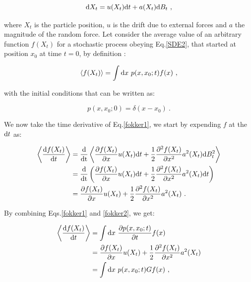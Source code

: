 \begin{equation}
	\textnormal{d}X_t = u(X_t) \textnormal{d}t + a(X_t)\textnormal{d}B_t ~,
	\label{SDE2}
\end{equation}

where $X_t$ is the particle position,  $u$ is the drift due to external forces and $a$ the magnitude of the random force. Let consider the average value of an arbitrary function $f(X_t)$ for a stochastic process obeying Eq.\ref{SDE2}, that started at position $x_0$ at time $t=0$, by definition \cite{le_bellac_equilibrium_2004}:

\begin{equation}
	\langle f(X_t) \rangle = \int \textnormal{d}x ~ p(x, x_0 ; t) f(x) ~,
	\label{fokker1}
\end{equation}

with the initial conditions that can be written as:

\begin{equation}
	p(x, x_0; 0) = \delta (x - x_0) ~.
\end{equation}

We now take the time derivative of Eq.\ref{fokker1}, we start by expending $ f$ at the $\textnormal{d}t$ as:

\begin{equation}
	\begin{aligned}
	\left\langle \frac{\textnormal{d}f(X_t)}{\textnormal{d}t} \right\rangle  &= \frac{\textnormal{d}}{\textnormal{dt}}\left\langle   \frac{\partial f(X_t)}{\partial x} u(X_t) \textnormal{d}t + \frac{1}{2} \frac{\partial^2 f(X_t)}{\partial x^2} a^2 (X_t) \textnormal{d}B_t^2   \right\rangle \\
	& =  \frac{\textnormal{d}}{\textnormal{dt}} \left( \frac{\partial f(X_t)}{\partial x} u(X_t) \textnormal{d}t + \frac{1}{2} \frac{\partial^2 f(X_t)}{\partial x^2} a^2 (X_t) \textnormal{d}t \right) \\
	& = \frac{\partial f(X_t)}{\partial x} u(X_t) + \frac{1}{2} \frac{\partial^2 f(X_t)}{\partial x^2} a^2 (X_t) ~.
	\end{aligned}
	\label{fokker2}
\end{equation}

By combining Eqs.\ref{fokker1} and \ref{fokker2}, we get:

\begin{equation}
	\begin{aligned}
	\left\langle \frac{\textnormal{d}f(X_t)}{\textnormal{d}t} \right\rangle &= \int \textnormal{d} x ~\frac{\partial p(x, x_0 ; t) }{\partial t} f(x) \\
	& =  \frac{\partial f(X_t)}{\partial x} u(X_t) + \frac{1}{2} \frac{\partial^2 f(X_t)}{\partial x^2} a^2 (X_t) \\
	& = \int \textnormal{d}x ~ p(x, x_0 ; t) G f(x) ~,
	\end{aligned}
\end{equation}

